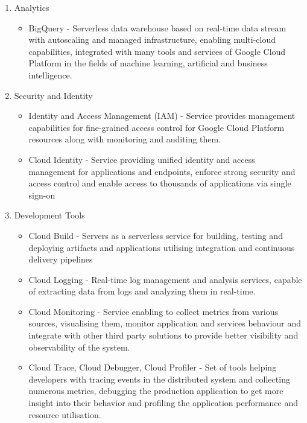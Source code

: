 \begin{enumerate}
\begin{itemize}
   \end{itemize}
   \item Analytics
   \begin{itemize}
       \item BigQuery - Serverless data warehouse based on real-time data stream with autoscaling and managed infrastructure, enabling multi-cloud capabilities, integrated with many tools and services of Google Cloud Platform in the fields of machine learning, artificial and business intelligence.
   \end{itemize}
   \item Security and Identity
   \begin{itemize}
       \item Identity and Access Management (IAM) - Service provides management capabilities for fine-grained access control for Google Cloud Platform resources along with monitoring and auditing them.
       \item Cloud Identity - Service providing unified identity and access management for applications and endpoints, enforce strong security and access control and enable access to thousands of applications via single sign-on
   \end{itemize}
   \item Development Tools
   \begin{itemize}
       \item Cloud Build - Servers as a serverless service for building, testing and deploying artifacts and applications utilising integration and continuous delivery pipelines
       \item Cloud Logging - Real-time log management and analysis services, capable of extracting data from logs and analyzing them in real-time.
       \item Cloud Monitoring - Service enabling to collect metrics from various sources, visualising them, monitor application and services behaviour and integrate with other third party solutions to provide better visibility and observability of the system.
       \item Cloud Trace, Cloud Debugger, Cloud Profiler - Set of tools helping developers with tracing events in the distributed system and collecting numerous metrics, debugging the production application to get more insight into their behavior and profiling the application performance and resource utilisation.
   \end{itemize}
\end{enumerate}

